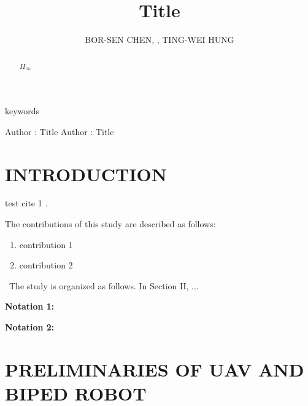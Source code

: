 \documentclass{ieeeaccess}%
\begin{document}
\title{Title}
\author{\uppercase{Bor-Sen Chen}, , \uppercase{Ting-Wei Hung}}

\begin{abstract}
$H_{\infty}$
\end{abstract}

\begin{keywords}
keywords
\end{keywords}

 

\address[1]{Department of Electrical Engineering, National Tsing Hua
University, Hsinchu 30013, Taiwan} \address[2]{Department of Electrical
Engineering, Yuan Ze University, Taoyuan 32003, Taiwan}


\markboth
{Author \headeretal: Title}
{Author \headeretal: Title}

 \titlepgskip=-15pt
\maketitle

\section{INTRODUCTION}

 test cite 1 \cite{gait1}.

The contributions of this study are described as follows:

\begin{enumerate}
\item contribution 1

\item contribution 2

\end{enumerate}

\ The study is organized as follows. In Section II, ...

\textbf{Notation 1:} 

\textbf{Notation 2:} 

\section{PRELIMINARIES OF UAV AND BIPED ROBOT}
\end{document}
